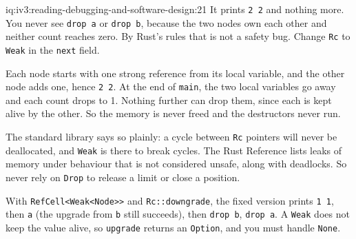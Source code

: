 \begin{solution}{iq:iv3:reading-debugging-and-software-design:21}
It prints \texttt{2 2} and nothing more. You never see \texttt{drop a} or \texttt{drop b}, because the two nodes own each other and neither count reaches zero. By Rust's rules that is not a safety bug. Change \texttt{Rc} to \texttt{Weak} in the \texttt{next} field.

Each node starts with one strong reference from its local variable, and the other node adds one, hence \texttt{2 2}. At the end of \texttt{main}, the two local variables go away and each count drops to 1. Nothing further can drop them, since each is kept alive by the other. So the memory is never freed and the destructors never run.

The standard library says so plainly: a cycle between \texttt{Rc} pointers will never be deallocated, and \texttt{Weak} is there to break cycles. The Rust Reference lists leaks of memory under behaviour that is not considered unsafe, along with deadlocks. So never rely on \texttt{Drop} to release a limit or close a position.

With \texttt{RefCell<Weak<Node>{}>} and \texttt{Rc::downgrade}, the fixed version prints \texttt{1 1}, then \texttt{a} (the upgrade from \texttt{b} still succeeds), then \texttt{drop b}, \texttt{drop a}. A \texttt{Weak} does not keep the value alive, so \texttt{upgrade} returns an \texttt{Option}, and you must handle \texttt{None}.



\end{solution}

